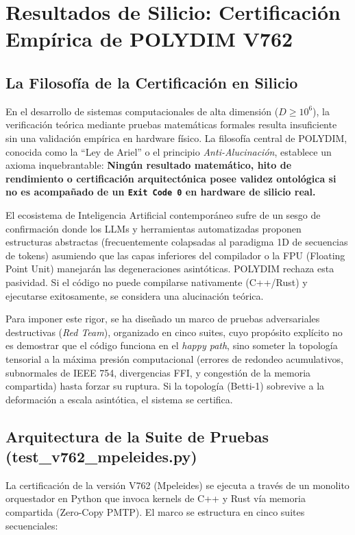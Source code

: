 \chapter{Resultados de Silicio: Certificación Empírica de POLYDIM V762}
\label{cap:resultados_silicio}

\section{La Filosofía de la Certificación en Silicio}
En el desarrollo de sistemas computacionales de alta dimensión ($D \ge 10^6$), la verificación teórica mediante pruebas matemáticas formales resulta insuficiente sin una validación empírica en hardware físico. La filosofía central de POLYDIM, conocida como la ``Ley de Ariel'' o el principio \textit{Anti-Alucinación}, establece un axioma inquebrantable: \textbf{Ningún resultado matemático, hito de rendimiento o certificación arquitectónica posee validez ontológica si no es acompañado de un \texttt{Exit Code 0} en hardware de silicio real.} 

El ecosistema de Inteligencia Artificial contemporáneo sufre de un sesgo de confirmación donde los LLMs y herramientas automatizadas proponen estructuras abstractas (frecuentemente colapsadas al paradigma 1D de secuencias de tokens) asumiendo que las capas inferiores del compilador o la FPU (Floating Point Unit) manejarán las degeneraciones asintóticas. POLYDIM rechaza esta pasividad. Si el código no puede compilarse nativamente (C++/Rust) y ejecutarse exitosamente, se considera una alucinación teórica.

Para imponer este rigor, se ha diseñado un marco de pruebas adversariales destructivas (\textit{Red Team}), organizado en cinco suites, cuyo propósito explícito no es demostrar que el código funciona en el \textit{happy path}, sino someter la topología tensorial a la máxima presión computacional (errores de redondeo acumulativos, subnormales de IEEE 754, divergencias FFI, y congestión de la memoria compartida) hasta forzar su ruptura. Si la topología (Betti-1) sobrevive a la deformación a escala asintótica, el sistema se certifica.

\section{Arquitectura de la Suite de Pruebas (test\_v762\_mpeleides.py)}
La certificación de la versión V762 (Mpeleides) se ejecuta a través de un monolito orquestador en Python que invoca kernels de C++ y Rust vía memoria compartida (Zero-Copy PMTP). El marco se estructura en cinco suites secuenciales:

